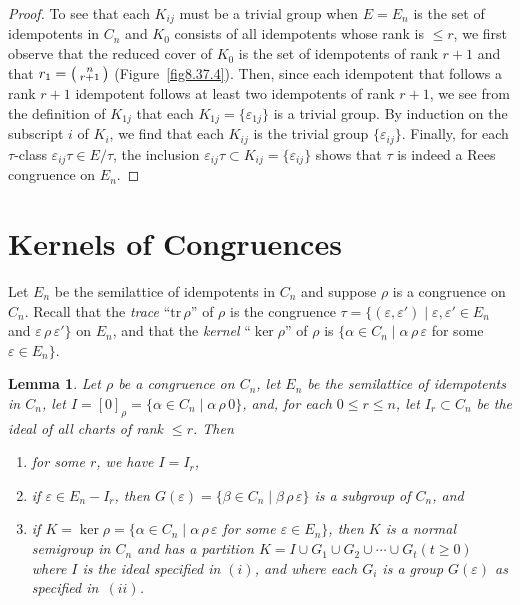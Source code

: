 \documentclass{surv-l}
\numberwithin{equation}{section}
\numberwithin{table}{section}
\numberwithin{figure}{section}
\theoremstyle{plain}
\newtheorem{lemma}[equation]{Lemma}
\theoremstyle{definition}
\begin{document}
\begin{proof}
To see that each $K_{ij}$ must be a trivial group when $E=E_{n}$
is the set of idempotents in $C_{n}$ and $K_{0}$ consists of all
idempotents whose rank is $\leq r$, we first observe that the
reduced cover of $K_{0}$ is the set of idempotents of rank $r+1$
and that $r_{1}=\big(\kern0.5pt\begin{smallmatrix}
n\\
r+1\end{smallmatrix}\kern0.5pt\big)$ (Figure~\ref{fig8.37.4}). Then, since
each idempotent that follows a rank $r+1$ idempotent follows at
least two idempotents of rank $r+1$, we see from the definition of
$K_{1j}$ that each $K_{1j}=\{\varepsilon_{1j}\}$ is a trivial
group. By induction on the subscript $i$ of $K_{i}$, we find that
each $K_{ij}$ is the trivial group $\{\varepsilon_{ij}\}$.
Finally, for each $\tau$-class $\varepsilon_{ij}\tau\in E/\tau$,
the inclusion $\varepsilon_{ij}\tau\subset
K_{ij}=\{\varepsilon_{ij}\}$ shows that $\tau$ is indeed a Rees
congruence on $E_{n}.$
\end{proof}

\section{Kernels of Congruences}\label{sec8.38}

Let $E_{n}$ be the semilattice of idempotents in $C_{n}$ and
suppose $\rho$ is a congruence on $C_{n}$. Recall that the
\emph{trace} ``$\mathrm{tr}\,\rho$'' of $\rho$ is the congruence
$\tau= \{ (\varepsilon, \varepsilon') \mid \varepsilon,
\varepsilon'\in E_{n}$ and $\varepsilon\, \rho\,\varepsilon'\}$ on
$E_{n}$, and that the \emph{kernel} ``$\ker \rho$'' of
$\rho$ is $\{\alpha\in C_{n}\mid \alpha\,\rho\,\varepsilon$ for
some $\varepsilon \in E_{n}\}$.

\begin{lemma}\label{8.38.1}
Let $\rho$ be a congruence on $C_{n}$, let $E_{n}$ be the
semilattice of idempotents in $C_{n}$, let $I
=[0]_{\rho}=\{\alpha\in C_{n}\mid \alpha\,\rho\,0\}$, and, for
each $0\leq r\leq n$, let $I_{r}\subset C_{n}$ be the ideal of all
charts of rank $\leq r$. Then
\begin{enumerate}
\item[(\emph{i})] for some $r$, we have $I =I_{r}$,

\item[(ii)] if $\varepsilon\in E_{n}-I_{r}$, then
$G(\varepsilon)=\{\beta\in
C_{n}\mid \beta\,\rho\,\varepsilon\}$ is a subgroup of $C_{n}$,
and

\item[(\emph{iii})] if $K=\ker \rho=\{\alpha\in
C_{n}\mid \alpha\,\rho\,\varepsilon$ for some $\varepsilon\in
E_{n}\}$, then $K$ is a normal semigroup in $C_{n}$ and has a
partition $K=I\cup G_{1}\cup G_{2}\cup\cdots\cup G_{t}(t\geq
0)$ where $I$ is the ideal specified in $(i)$, and where each
$G_{i}$ is a group $G(\varepsilon)$ as specified in~$(ii)$.
\end{enumerate}
\end{lemma}
\end{document}
